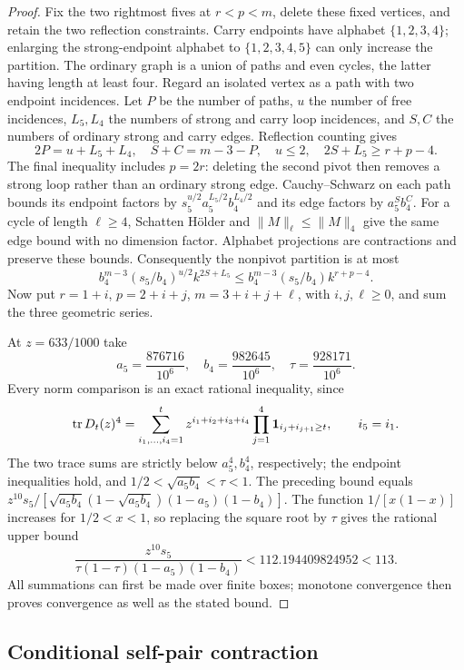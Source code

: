\documentclass[11pt]{amsart}
\theoremstyle{definition}
\theoremstyle{remark}
\numberwithin{equation}{section}
\begin{document}
\begin{proof}
Fix the two rightmost fives at $r<p<m$, delete these fixed vertices,
and retain the two reflection constraints. Carry endpoints have alphabet
$\{1,2,3,4\}$; enlarging the strong-endpoint alphabet to
$\{1,2,3,4,5\}$ can only increase the partition. The ordinary graph is a
union of paths and even cycles, the latter having length at least four.
Regard an isolated vertex as a path with two endpoint incidences. Let $P$
be the number of paths, $u$ the number of free incidences, $L_5,L_4$ the
numbers of strong and carry loop incidences, and $S,C$ the numbers of
ordinary strong and carry edges. Reflection counting gives
\[
 2P=u+L_5+L_4,\quad S+C=m-3-P,\quad u\le2,
 \quad 2S+L_5\ge r+p-4.
\]
The final inequality includes $p=2r$: deleting the second pivot then
removes a strong loop rather than an ordinary strong edge.
Cauchy--Schwarz on each path bounds its endpoint factors by
$s_5^{u/2}a_5^{L_5/2}b_4^{L_4/2}$ and its edge factors by
$a_5^S b_4^C$. For a cycle of length $\ell\ge4$, Schatten H\"older and
$\|M\|_\ell\le\|M\|_4$ give the same edge bound with no dimension
factor. Alphabet projections are contractions and preserve these bounds.
Consequently the nonpivot partition is at most
\[
 b_4^{m-3}(s_5/b_4)^{u/2}k^{2S+L_5}
 \le b_4^{m-3}(s_5/b_4)k^{r+p-4}.
\]
Now put $r=1+i$, $p=2+i+j$, $m=3+i+j+\ell$, with
$i,j,\ell\ge0$, and sum the three geometric series.

At $z=633/1000$ take
\[
 a_5=\frac{876716}{10^6},\quad b_4=\frac{982645}{10^6},\quad
 \tau=\frac{928171}{10^6}.
\]
Every norm comparison is an exact rational inequality, since
\[
 \operatorname{tr}D_t(z)^4=
 \sum_{i_1,\ldots,i_4=1}^t
 z^{i_1+i_2+i_3+i_4}
 \prod_{j=1}^4{\bf1}_{i_j+i_{j+1}\ge t},\qquad i_5=i_1.
\]
The two trace sums are strictly below $a_5^4,b_4^4$, respectively;
the endpoint inequalities hold, and
$1/2<\sqrt{a_5b_4}<\tau<1$.
The preceding bound equals
$z^{10}s_5/[\sqrt{a_5b_4}(1-\sqrt{a_5b_4})(1-a_5)(1-b_4)]$.
The function $1/[x(1-x)]$ increases for $1/2<x<1$, so replacing the
square root by $\tau$ gives the rational upper bound
\[
 \frac{z^{10}s_5}{\tau(1-\tau)(1-a_5)(1-b_4)}
 <112.194409824952<113.
\]
All summations can first be made over finite boxes; monotone convergence
then proves convergence as well as the stated bound.
\end{proof}

\subsection{Conditional self-pair contraction}
\end{document}
